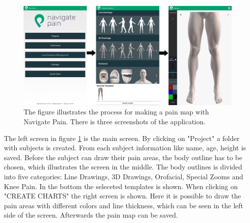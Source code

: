 \begin{figure} [H]
\centering
\includegraphics[width=1\textwidth]{figures/Navigatepain}
\caption{The figure illustrates the process for making a pain map with Navigate Pain. There is three screenshots of the application.}
\label{fig:Navigatepain}
\end{figure}

\noindent
The left screen in figure \ref{fig:Navigatepain} is the main screen. By clicking on "Project" a folder with subjects is created. From each subject information like name, age, height is saved. Before the subject can draw their pain areas, the body outline has to be chosen, which illustrates the screen in the middle. The body outlines is divided into five categories: Line Drawings, 3D Drawings, Orofacial, Special Zooms and Knee Pain. In the bottom the seleceted templates is shown. When clicking on "CREATE CHARTS" the right screen is shown. Here it is possible to draw the pain areas with different colors and line thickness, which can be seen in the left side of the screen. Afterwards the pain map can be saved. 
